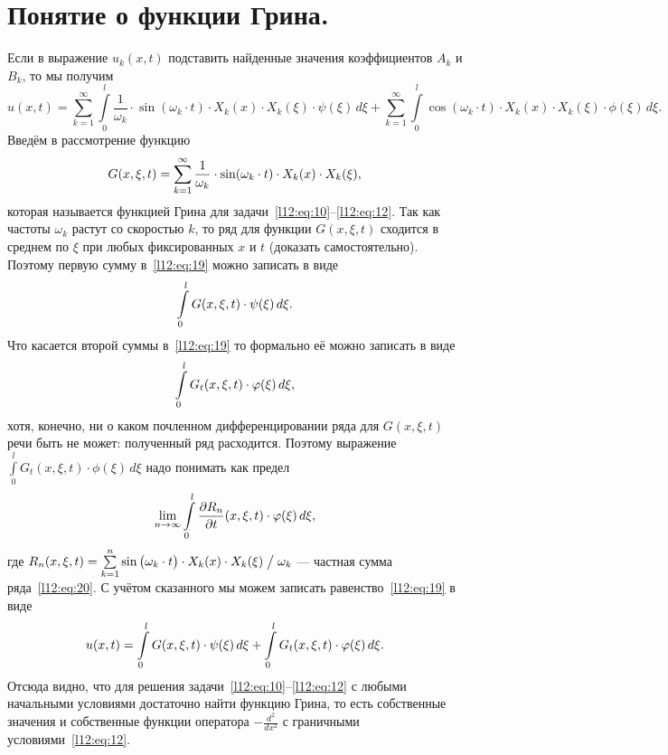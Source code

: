 \documentclass[12pt,a4paper,openany,fleqn]{book}
\newcommand{\dder}[2]{\ensuremath{\frac{d^2#1}{d#2^2}}}
\newcommand{\pder}[2]{\ensuremath{\frac{\partial#1}{\partial#2}}}
\theoremstyle{definition}
\begin{document}
\section{Понятие о функции Грина.}
\label{lecture11section3}
Если в выражение $u_k(x,t)$ подставить найденные значения коэффициентов $A_k$ и  $B_k$, то мы получим
\begin{equation}
	\label{l12:eq:19}
	u(x,t)=\sum\limits_{k=1}^{\infty}\int\limits_0^l\frac{1}{\omega_k}\cdot\sin(\omega_k\cdot t)\cdot X_k(x)\cdot X_k(\xi)\cdot\psi(\xi)\,d\xi+ \sum\limits_{k=1}^{\infty}\int\limits_0^l\cos(\omega_k\cdot t)\cdot X_k(x)\cdot X_k(\xi)\cdot\phi(\xi)\,d\xi.
\end{equation}
Введём в рассмотрение функцию
\begin{equation}
	\label{l12:eq:20}
	\hfill G(x,\xi,t)=\sum\limits_{k=1}^{\infty}\frac{1}{\omega_k}\cdot\sin(\omega_k\cdot t)\cdot X_k(x)\cdot X_k(\xi),\hfill
\end{equation}
которая называется функцией Грина для задачи~\eqref{l12:eq:10}--\eqref{l12:eq:12}. Так как частоты $\omega_k$ растут со скоростью $k$, то ряд для функции $G(x,\xi,t)$ сходится в среднем по $\xi$ при любых фиксированных $x$ и $t$ (доказать самостоятельно). Поэтому первую сумму в~\eqref{l12:eq:19} можно записать в виде 
\begin{equation*}
	\hfill\int\limits_0^l G(x,\xi,t)\cdot\psi(\xi)\,d\xi.\hfill
\end{equation*}
Что касается второй суммы в~\eqref{l12:eq:19} то формально её можно записать в виде 
\begin{equation*}
	\hfill\int\limits_0^l G_t(x,\xi,t)\cdot\phi(\xi)\,d\xi,\hfill
\end{equation*}
хотя, конечно, ни о каком почленном дифференцировании ряда для $G(x,\xi,t)$ речи быть не может: полученный ряд расходится. Поэтому выражение $\int\limits_0^l G_t(x,\xi,t)\cdot\phi(\xi)\,d\xi$ надо понимать как предел 
\begin{equation*}
	\hfill\lim\limits_{n\to\infty}\int\limits_0^l\pder{R_n}{t}(x,\xi,t)\cdot\phi(\xi)\,d\xi,\hfill
\end{equation*}
где $R_n(x,\xi,t)=\sum\limits_{k=1}^n\sin\big(\omega_k\cdot t\big)\cdot X_k(x)\cdot X_k(\xi)\bigm/\omega_k$ --- частная сумма ряда~\eqref{l12:eq:20}. С учётом сказанного мы можем записать равенство~\eqref{l12:eq:19} в виде
\begin{equation}
	\label{l12:eq:21}
	\hfill u(x,t)=\int\limits_0^l G(x,\xi,t)\cdot\psi(\xi)\,d\xi+\int\limits_0^l G_t(x,\xi,t)\cdot\phi(\xi)\,d\xi.\hfill
\end{equation}
Отсюда видно, что для решения задачи~\eqref{l12:eq:10}--\eqref{l12:eq:12} с любыми начальными условиями достаточно найти функцию Грина, то есть собственные значения и собственные функции оператора $-\displaystyle\dder{}{x}$ с граничными условиями~\eqref{l12:eq:12}.
\end{document}
